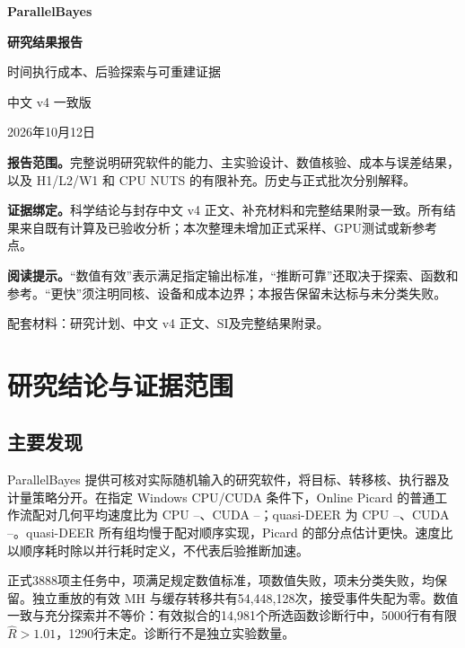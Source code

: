 \documentclass[UTF8,zihao=-4,a4paper,fontset=fandol]{ctexart}
\begin{document}
\begin{titlepage}\centering
\vspace*{18mm}
{\LARGE\bfseries ParallelBayes\par}
\vspace{10mm}
{\huge\bfseries 研究结果报告\par}
\vspace{5mm}
{\Large 时间执行成本、后验探索与可重建证据\par}
\vspace{12mm}
{\large 中文 v4 一致版\par}
{\large 2026年10月12日\par}
\vspace{16mm}
\begin{minipage}{.87\linewidth}
\textbf{报告范围。}完整说明研究软件的能力、主实验设计、数值核验、成本与误差结果，以及 H1/L2/W1 和 CPU NUTS 的有限补充。历史与正式批次分别解释。

\textbf{证据绑定。}科学结论与封存中文 v4 正文、补充材料和完整结果附录一致。所有结果来自既有计算及已验收分析；本次整理未增加正式采样、GPU测试或新参考点。

\textbf{阅读提示。}“数值有效”表示满足指定输出标准，“推断可靠”还取决于探索、函数和参考。“更快”须注明同核、设备和成本边界；本报告保留未达标与未分类失败。
\end{minipage}
\vfill
{\small 配套材料：研究计划、中文 v4 正文、SI及完整结果附录。\par}
\end{titlepage}
\tableofcontents\clearpage


\section{研究结论与证据范围}
\subsection{主要发现}
ParallelBayes 提供可核对实际随机输入的研究软件，将目标、转移核、执行器及计量策略分开。在指定 Windows CPU/CUDA 条件下，Online Picard 的普通工作流配对几何平均速度比为 CPU \PBCPURWMMin--\PBCPURWMMax、CUDA \PBCUDARWMMin--\PBCUDARWMMax；quasi-DEER 为 CPU \PBCPUMALAMin--\PBCPUMALAMax、CUDA \PBCUDAMALAMin--\PBCUDAMALAMax。quasi-DEER 所有组均慢于配对顺序实现，Picard 的部分点估计更快。速度比以顺序耗时除以并行耗时定义，不代表后验推断加速。

正式3888项主任务中，\PBCompactValid 项满足规定数值标准，\PBCompactNumerical 项数值失败，\PBCompactUnclassified 项未分类失败，均保留。独立重放的有效 MH 与缓存转移共有54,448,128次，接受事件失配为零。数值一致与充分探索并不等价：有效拟合的14,981个所选函数诊断行中，5000行有有限 $\hat R>1.01$，1290行未定。诊断行不是独立实验数量。
\end{document}
